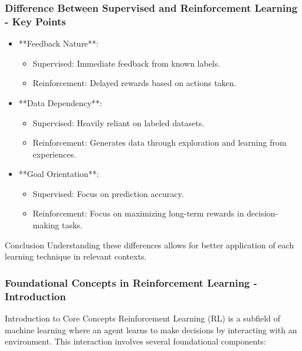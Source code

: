 \documentclass[aspectratio=169]{beamer}
\begin{document}
\begin{frame}[fragile]
    \frametitle{Difference Between Supervised and Reinforcement Learning - Key Points}
    \begin{itemize}
        \item **Feedback Nature**:
            \begin{itemize}
                \item Supervised: Immediate feedback from known labels.
                \item Reinforcement: Delayed rewards based on actions taken.
            \end{itemize}
        \item **Data Dependency**:
            \begin{itemize}
                \item Supervised: Heavily reliant on labeled datasets.
                \item Reinforcement: Generates data through exploration and learning from experiences.
            \end{itemize}
        \item **Goal Orientation**:
            \begin{itemize}
                \item Supervised: Focus on prediction accuracy.
                \item Reinforcement: Focus on maximizing long-term rewards in decision-making tasks.
            \end{itemize}
    \end{itemize}
    
    \begin{block}{Conclusion}
        Understanding these differences allows for better application of each learning technique in relevant contexts.
    \end{block}
\end{frame}

\begin{frame}[fragile]
    \frametitle{Foundational Concepts in Reinforcement Learning - Introduction}
    \begin{block}{Introduction to Core Concepts}
        Reinforcement Learning (RL) is a subfield of machine learning where an agent learns to make decisions by interacting with an environment. This interaction involves several foundational components:
    \end{block}
\end{frame}
\end{document}

